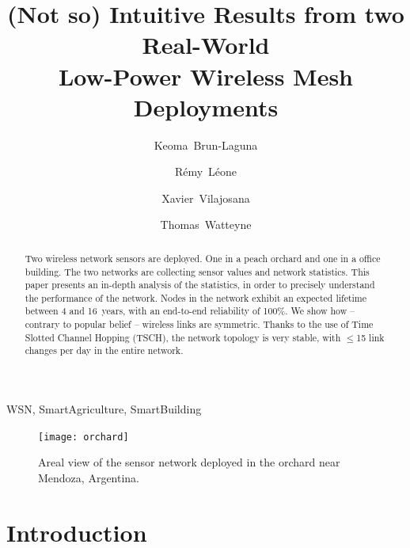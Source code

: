 \documentclass{elsarticle}
\begin{document}
	
\begin{frontmatter}
    
\date{}
	
\title{(Not so) Intuitive Results from two Real-World\\Low-Power Wireless Mesh Deployments}

\author[inria]{Keoma~Brun-Laguna}
\author[inria]{R\'emy~L\'eone}
\author[uoc]{Xavier~Vilajosana}
\author[inria]{Thomas~Watteyne}

\address[inria]{Inria, EVA team, Paris, France}
\address[uoc]{Univ. Oberta de Catalunya, Barcelona, Catalonia, Spain}



\begin{abstract}
Two wireless network sensors are deployed.
One in a peach orchard and one in a office building.
The two networks are collecting sensor values and network statistics.
This paper presents an in-depth analysis of the statistics, in order to precisely understand the performance of the network.
Nodes in the network exhibit an expected lifetime between 4 and 16~years, with an end-to-end reliability of 100\%.
We show how -- contrary to popular belief -- wireless links are symmetric.
Thanks to the use of Time Slotted Channel Hopping (TSCH), the network topology is very stable, with $\leq$15 link changes per day in the entire network.
\end{abstract}

\begin{keyword}
    WSN, SmartAgriculture, SmartBuilding
\end{keyword}

\end{frontmatter}


\begin{figure}
    \centering
    \texttt{[image: orchard]}
    \caption{Areal view of the sensor network deployed in the orchard near Mendoza, Argentina.}
    \label{fig:orchard}
\end{figure}

\section{Introduction}
\label{sec:intro}
\end{document}
